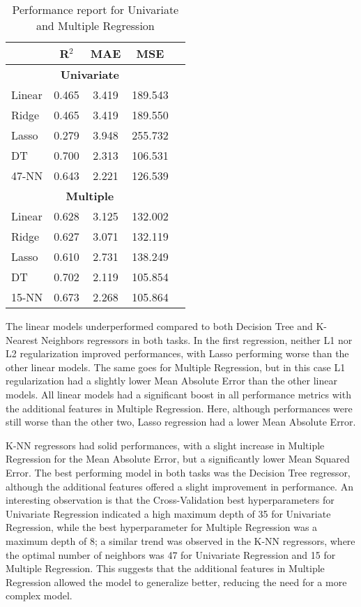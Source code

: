 \begin{table}[H]
    \centering
    \begin{tabular}{lc@{\hskip 30pt}ccc}
        \toprule
         & \textbf{R$^2$} & \textbf{MAE} & \textbf{MSE} \\
        \midrule
        \multicolumn{4}{c}{\textbf{Univariate}} \\
        \midrule
        Linear & 0.465 & 3.419 & 189.543 \\
        Ridge & 0.465 & 3.419 & 189.550 \\
        Lasso & 0.279 & 3.948 & 255.732 \\
        DT & 0.700 & 2.313 & 106.531 \\ %
        47-NN & 0.643 & 2.221 & 126.539 \\ %
        \midrule
        \multicolumn{4}{c}{\textbf{Multiple}} \\
        \midrule
        Linear & 0.628 & 3.125 & 132.002 \\
        Ridge & 0.627 & 3.071 & 132.119 \\ %
        Lasso & 0.610 & 2.731 & 138.249 \\ %
        DT & 0.702 & 2.119 & 105.854 \\ %
        15-NN & 0.673 & 2.268 & 105.864 \\ %
        \bottomrule
    \end{tabular}
    \caption{Performance report for Univariate and Multiple Regression}
    \label{tab:uni_multi_regression_report}
\end{table}
The linear models underperformed compared to both Decision
Tree and K-Nearest Neighbors regressors in both tasks. In the first regression, neither L1 nor L2
regularization improved performances, with Lasso performing worse than the other linear models.
The same goes for Multiple Regression, but in this case L1 regularization had a slightly lower Mean Absolute Error
than the other linear models.
All linear models had a significant boost in all performance metrics with the additional features in Multiple Regression.
Here, although performances were still worse than the other two, Lasso regression had a lower Mean Absolute Error.

K-NN regressors had solid performances, with a slight increase in Multiple Regression for the Mean Absolute Error,
but a significantly lower Mean Squared Error.
The best performing model in both tasks was the Decision Tree regressor, although the additional features
offered a slight improvement in performance. An interesting observation is that the Cross-Validation
best hyperparameters for Univariate Regression indicated a high maximum depth of 35 for Univariate Regression,
while the best hyperparameter for Multiple Regression was a maximum depth of 8; a similar trend was observed
in the K-NN regressors, where the optimal number of neighbors was 47 for Univariate Regression and 15 for Multiple Regression.
This suggests that the additional features in Multiple Regression allowed the model to generalize better,
reducing the need for a more complex model.



